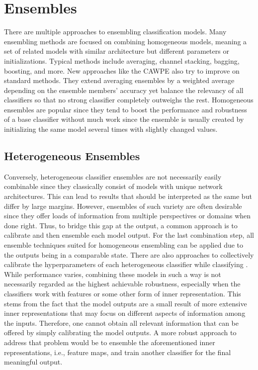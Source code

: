 \section{Ensembles}
\label{sec:ensembles}

There are multiple approaches to ensembling classification models. Many ensembling methods are focused on combining homogeneous 
models, meaning a set of related models with similar architecture but different parameters or initializations. Typical methods \cite{Opitz_1999ensemblebasics} include 
averaging, channel stacking, bagging, boosting, and more. New approaches like the CAWPE \cite{Large_2019CAPE} also try to improve on standard methods. They extend averaging ensembles by 
a weighted average depending on the ensemble members' accuracy yet balance the relevancy of all classifiers so that no strong classifier completely outweighs the rest.\newline
Homogeneous ensembles are popular since they tend to boost the performance and robustness of a base classifier without 
much work since the ensemble is usually created by initializing the same model several times with slightly changed values.

\subsection{Heterogeneous Ensembles}

Conversely, heterogeneous classifier ensembles are not necessarily easily combinable since they classically consist of models with 
unique network architectures. This can lead to results that should be interpreted as the same but differ by large margins. However, 
ensembles of such variety are often desirable since they offer loads of information from multiple perspectives or domains when done right. 
\newline
Thus, to bridge this gap at the output, a common approach is to calibrate \cite{Guo_2017_tempscalingetc} and then ensemble each model 
output. For the last combination step, all ensemble techniques suited for homogeneous ensembling can 
be applied due to the outputs being in a comparable state. There are also approaches to collectively calibrate the hyperparameters 
of each heterogeneous classifier while classifying \cite{Guo_2017_tempscalingetc}. While performance varies, combining 
these models in such a way is not necessarily regarded as the highest achievable robustness, especially when the classifiers work with features or some other form of inner representation. 
This stems from the fact that the model outputs are a small result of more extensive inner representations that may focus on different aspects 
of information among the inputs. Therefore, one cannot obtain all relevant information that can be offered by simply calibrating the 
model outputs. A more robust approach to address that problem would be to ensemble the aforementioned inner representations, i.e., feature maps, and train another classifier for the final meaningful output.

